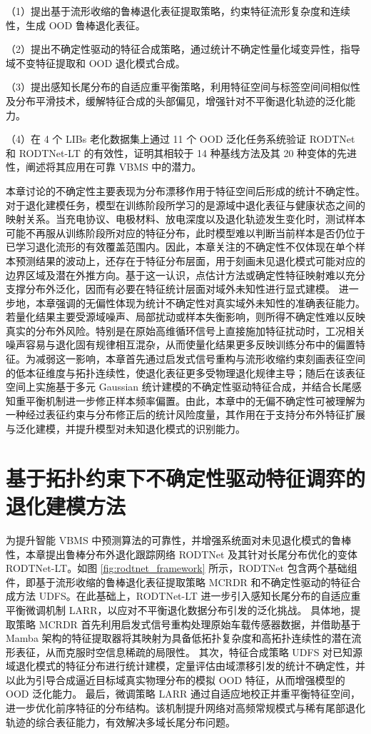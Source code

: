 （1）提出基于流形收缩的鲁棒退化表征提取策略，约束特征流形复杂度和连续性，生成 OOD 鲁棒退化表征。

（2）提出不确定性驱动的特征合成策略，通过统计不确定性量化域变异性，指导域不变特征提取和 OOD 退化模式合成。

（3）提出感知长尾分布的自适应重平衡策略，利用特征空间与标签空间间相似性及分布平滑技术，缓解特征合成的头部偏见，增强针对不平衡退化轨迹的泛化能力。

（4）在 4 个 LIBs 老化数据集上通过 11 个 OOD 泛化任务系统验证 RODTNet 和 RODTNet-LT 的有效性，证明其相较于 14 种基线方法及其 20 种变体的先进性，阐述将其应用在可靠 VBMS 中的潜力。

本章讨论的不确定性主要表现为分布漂移作用于特征空间后形成的统计不确定性。对于退化建模任务，模型在训练阶段所学习的是源域中退化表征与健康状态之间的映射关系。当充电协议、电极材料、放电深度以及退化轨迹发生变化时，测试样本可能不再服从训练阶段所对应的特征分布，此时模型难以判断当前样本是否仍位于已学习退化流形的有效覆盖范围内。因此，本章关注的不确定性不仅体现在单个样本预测结果的波动上，还存在于特征分布层面，用于刻画未见退化模式可能对应的边界区域及潜在外推方向。基于这一认识，点估计方法或确定性特征映射难以充分支撑分布外泛化，因而有必要在特征统计层面对域外未知性进行显式建模。
% 
进一步地，本章强调的无偏性体现为统计不确定性对真实域外未知性的准确表征能力。若量化结果主要受源域噪声、局部扰动或样本失衡影响，则所得不确定性难以反映真实的分布外风险。特别是在原始高维循环信号上直接施加特征扰动时，工况相关噪声容易与退化固有规律相互混杂，从而使量化结果更多反映训练分布中的偏置特征。为减弱这一影响，本章首先通过启发式信号重构与流形收缩约束刻画表征空间的低本征维度与拓扑连续性，使退化表征更多受物理退化规律主导；随后在该表征空间上实施基于多元 Gaussian 统计建模的不确定性驱动特征合成，并结合长尾感知重平衡机制进一步修正样本频率偏置。由此，本章中的无偏不确定性可被理解为一种经过表征约束与分布修正后的统计风险度量，其作用在于支持分布外特征扩展与泛化建模，并提升模型对未知退化模式的识别能力。

\section{基于拓扑约束下不确定性驱动特征调弈的退化建模方法}\label{sec:RODTNet_methodology}

为提升智能 VBMS 中预测算法的可靠性，并增强系统面对未见退化模式的鲁棒性，本章提出鲁棒分布外退化跟踪网络 RODTNet 及其针对长尾分布优化的变体 RODTNet-LT。如图 \ref{fig:rodtnet_framework} 所示，RODTNet 包含两个基础组件，即基于流形收缩的鲁棒退化表征提取策略 MCRDR 和不确定性驱动的特征合成方法 UDFS。在此基础上，RODTNet-LT 进一步引入感知长尾分布的自适应重平衡微调机制 LARR，以应对不平衡退化数据分布引发的泛化挑战。
% 
具体地，提取策略 MCRDR 首先利用启发式信号重构处理原始车载传感器数据，并借助基于 Mamba 架构的特征提取器将其映射为具备低拓扑复杂度和高拓扑连续性的潜在流形表征，从而克服时空信息稀疏的局限性。
% 
其次，特征合成策略 UDFS 对已知源域退化模式的特征分布进行统计建模，定量评估由域漂移引发的统计不确定性，并以此为引导合成逼近目标域真实物理分布的模拟 OOD 特征，从而增强模型的 OOD 泛化能力。
% 
最后，微调策略 LARR 通过自适应地校正并重平衡特征空间，进一步优化前序特征的分布结构。该机制提升网络对高频常规模式与稀有尾部退化轨迹的综合表征能力，有效解决多域长尾分布问题。

